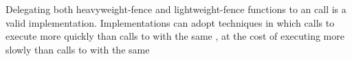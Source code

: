 \begin{note} Delegating both heavyweight-fence and lightweight-fence functions to an
 call is a valid implementation. Implementations can adopt
techniques in which calls to  execute more quickly than calls
to  with the same , at the cost of
 executing more slowly than calls to
 with the same \end{note}  


